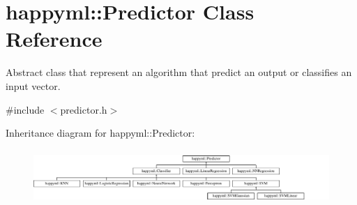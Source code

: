 \hypertarget{classhappyml_1_1Predictor}{}\section{happyml\+:\+:Predictor Class Reference}
\label{classhappyml_1_1Predictor}


Abstract class that represent an algorithm that predict an output or classifies an input vector.  




{\ttfamily \#include $<$predictor.\+h$>$}

Inheritance diagram for happyml\+:\+:Predictor\+:\begin{figure}[H]
\begin{center}
\leavevmode
\includegraphics[height=2.085661cm]{classhappyml_1_1Predictor}
\end{center}
\end{figure}

